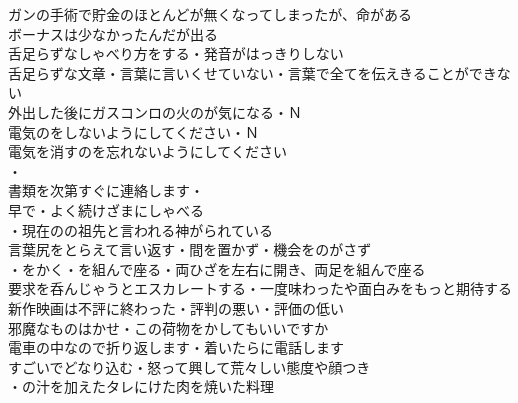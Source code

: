 ガンの手術で貯金のほとんどが無くなってしまったが、命がある\\
ボーナスは少なかったんだが出る\\
舌足らずなしゃべり方をする・発音がはっきりしない\\
舌足らずな文章・言葉に言いくせていない・言葉で全てを伝えきることができない\\

外出した後にガスコンロの火のが気になる・Ｎ\\
電気のをしないようにしてください・Ｎ\\
電気を消すのを忘れないようにしてください\\
・\\
書類を次第すぐに連絡します・\\

早で・よく続けざまにしゃべる\\
・現在のの祖先と言われる神がられている\\
言葉尻をとらえて言い返す・間を置かず・機会をのがさず\\
・をかく・を組んで座る・両ひざを左右に開き、両足を組んで座る\\
要求を呑んじゃうとエスカレートする・一度味わったや面白みをもっと期待する\\

新作映画は不評に終わった・評判の悪い・評価の低い\\
邪魔なものはかせ・この荷物をかしてもいいですか\\
電車の中なので折り返します・着いたらに電話します\\
すごいでどなり込む・怒って興して荒々しい態度や顔つき\\
・の汁を加えたタレにけた肉を焼いた料理\\
